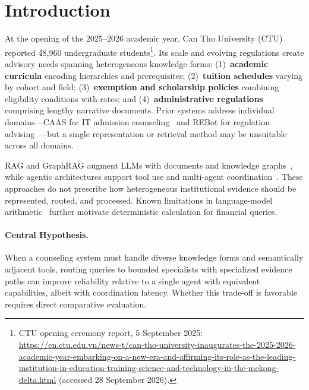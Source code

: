 \section{Introduction}
\label{sec:intro}

At the opening of the 2025--2026 academic year, Can Tho University (CTU) reported 48{,}960 undergraduate students\footnote{CTU opening ceremony report, 5 September 2025: \url{https://en.ctu.edu.vn/news-t/can-tho-university-inaugurates-the-2025-2026-academic-year-embarking-on-a-new-era-and-affirming-its-role-as-the-leading-institution-in-education-training-science-and-technology-in-the-mekong-delta.html} (accessed 28 September 2026).}. Its scale and evolving regulations create advisory needs spanning heterogeneous knowledge forms: (1)~\textbf{academic curricula} encoding hierarchies and prerequisites; (2)~\textbf{tuition schedules} varying by cohort and field; (3)~\textbf{exemption and scholarship policies} combining eligibility conditions with rates; and (4)~\textbf{administrative regulations} comprising lengthy narrative documents. Prior systems address individual domains---CAAS for IT admission counseling~\cite{ma2023caas} and REBot for regulation advising~\cite{ma2025rebot}---but a single representation or retrieval method may be unsuitable across all domains.

RAG and GraphRAG augment LLMs with documents and knowledge graphs~\cite{lewis2020rag,gao2023rag_survey,edge2024graphrag}, while agentic architectures support tool use and multi-agent coordination~\cite{yao2023react,wu2023autogen,schick2023toolformer}. These approaches do not prescribe how heterogeneous institutional evidence should be represented, routed, and processed. Known limitations in language-model arithmetic~\cite{qian2023limitations} further motivate deterministic calculation for financial queries.

\paragraph{Central Hypothesis.} When a counseling system must handle diverse knowledge forms and semantically adjacent tools, routing queries to bounded specialists with specialized evidence paths can improve reliability relative to a single agent with equivalent capabilities, albeit with coordination latency. Whether this trade-off is favorable requires direct comparative evaluation.

